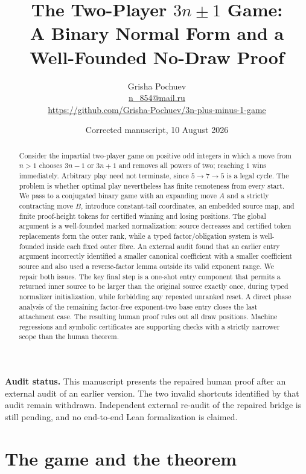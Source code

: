 \documentclass[11pt]{article}
\title{The Two-Player $3n\mathbin{\pm}1$ Game:\\
A Binary Normal Form and a Well-Founded No-Draw Proof}
\author{Grisha Pochuev\\
  \small\href{mailto:n_854@mail.ru}{n\_854@mail.ru}\\
  \small\url{https://github.com/Grisha-Pochuev/3n-plus-minus-1-game}}
\date{Corrected manuscript, 10 August 2026}
\begin{document}
\maketitle

\begin{center}
\small\textbf{Audit status.} This manuscript presents the repaired human proof after
an external audit of an earlier version. The two invalid shortcuts identified by
that audit remain withdrawn. Independent external re-audit of the repaired bridge
is still pending, and no end-to-end Lean formalization is claimed.
\end{center}

\begin{abstract}
Consider the impartial two-player game on positive odd integers in which a move
from $n>1$ chooses $3n-1$ or $3n+1$ and removes all powers of two; reaching $1$
wins immediately. Arbitrary play need not terminate, since $5\to7\to5$ is a
legal cycle. The problem is whether optimal play nevertheless has finite
remoteness from every start. We pass to a conjugated binary game with an
expanding move $A$ and a strictly contracting move $B$, introduce constant-tail
coordinates, an embedded source map, and finite proof-height tokens for certified
winning and losing positions. The global argument is a well-founded marked
normalization: source decreases and certified token replacements form the outer
rank, while a typed factor/obligation system is well-founded inside each fixed
outer fibre. An external audit found that an earlier entry argument incorrectly
identified a smaller canonical coefficient with a smaller coefficient source and
also used a reverse-factor lemma outside its valid exponent range. We repair both
issues. The key final step is a one-shot entry component that permits a returned
inner source to be larger than the original source exactly once, during typed
normalizer initialization, while forbidding any repeated unranked reset. A direct
phase analysis of the remaining factor-free exponent-two base entry closes the
last attachment case. The resulting human proof rules out all draw positions.
Machine regressions and symbolic certificates are supporting checks with a
strictly narrower scope than the human theorem.
\end{abstract}

\tableofcontents

\section{The game and the theorem}
\end{document}
